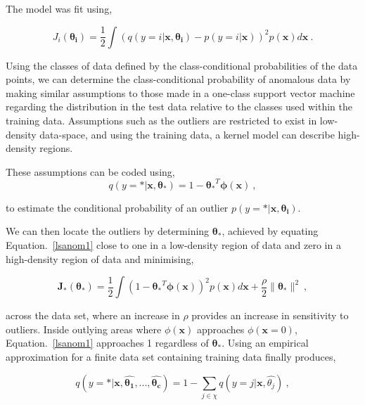 The model was fit using,

\begin{equation}
    J_i(\mathbf{\theta_i})=\dfrac{1}{2}\int(q(y=i|\mathbf{x},\mathbf{\theta_i}) - p(y=i|\mathbf{x}))^2p(\mathbf{x})d\mathbf{x}~.
\end{equation}

Using the classes of data defined by the class-conditional probabilities of the data points, we can determine the class-conditional probability of anomalous data by making similar assumptions to those made in a one-class support vector machine regarding the distribution in the test data relative to the classes used within the training data. Assumptions such as the outliers are restricted to exist in low-density data-space, and using the training data, a kernel model can describe high-density regions.

These assumptions can be coded using,
\begin{equation}
    q(y=\ast|\mathbf{x},\mathbf{\theta_{\ast}}) = 1 - \mathbf{\theta_{\ast}}^T\mathbf{\phi}(\mathbf{x})~,
        \label{lsanom1}
\end{equation}

to estimate the conditional probability of an outlier $p(y=\ast|\mathbf{x},\mathbf{\theta_i})$.

We can then locate the outliers by determining $\mathbf{\theta_{\ast}}$, achieved by equating Equation.~\eqref{lsanom1} close to one in a low-density region of data and zero in a high-density region of data and minimising,

\begin{equation}
\mathbf{J_{\ast}}(\mathbf{\theta_{\ast}}) = \dfrac{1}{2}\int(1 - \mathbf{\theta_{\ast}}^T\mathbf{\phi}(\mathbf{x}))^2p(\mathbf{x})d\mathbf{x} + \dfrac{\rho}{2}\|\mathbf{\theta_{\ast}}\|^2~,
\end{equation}

across the data set, where an increase in $\rho$ provides an increase in sensitivity to outliers. Inside outlying areas where $\phi(\mathbf{x})$ approaches $\phi(\mathbf{x}=0)$, Equation.~\eqref{lsanom1} approaches 1 regardless of $\mathbf{\theta_{\ast}}$. Using an empirical approximation for a finite data set containing training data finally produces,

\begin{equation}
q(y=\ast|\mathbf{x}, \mathbf{\widehat{\theta_{1}}},..., \mathbf{\widehat{\theta_{c}}}) = 1 - \sum_{j \in \chi}^{} q(y=j|\mathbf{x}, \widehat{\theta_{j}})~,
\end{equation}

